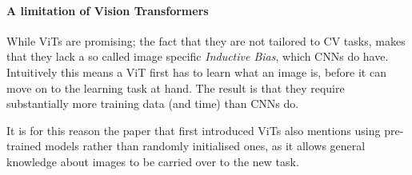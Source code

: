 






\paragraph{A limitation of Vision Transformers}
While ViTs are promising; the fact that they are not tailored to CV tasks, makes that they lack a so called image specific \textit{Inductive Bias}, which CNNs do have. Intuitively this means a ViT first has to learn what an image is, before it can move on to the learning task at hand. The result is that they require substantially more training data (and time) than CNNs do. 

It is for this reason the paper that first introduced ViTs \citep{dosovitskiy2020image} also mentions using pre-trained models rather than randomly initialised ones, as it allows general knowledge about images to be carried over to the new task. 

